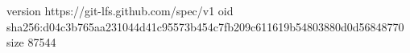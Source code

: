 version https://git-lfs.github.com/spec/v1
oid sha256:d04c3b765aa231044d41c95573b454c7fb209c611619b54803880d0d56848770
size 87544
